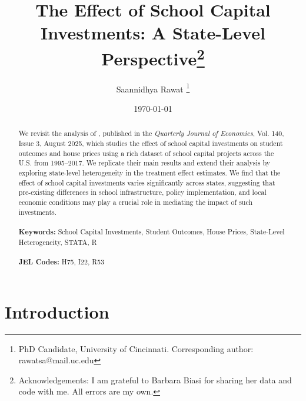 \documentclass[12pt]{article}
\begin{document}
\begin{titlepage}
\title{The Effect of School Capital Investments: A State-Level Perspective\thanks{Acknowledgements: I am grateful to Barbara Biasi for sharing her data and code with me. All errors are my own.}\\
}
\author{Saannidhya Rawat \thanks{PhD Candidate, University of Cincinnati. Corresponding author: rawatsa@mail.uc.edu}}
\date{\today} 
\maketitle


\begin{abstract}
\noindent We revisit the analysis of \cite{biasi_what_2025}, published in the \textit{Quarterly Journal of Economics}, Vol. 140, Issue 3, August 2025, which studies the effect of school capital investments on student outcomes and house prices using a rich dataset of school capital projects across the U.S. from 1995--2017. We replicate their main results and extend their analysis by exploring state-level heterogeneity in the treatment effect estimates. We find that the effect of school capital investments varies significantly across states, suggesting that pre-existing differences in school infrastructure, policy implementation, and local economic conditions may play a crucial role in mediating the impact of such investments.
\\
\vspace{0in}\\
\noindent\textbf{Keywords:} School Capital Investments, Student Outcomes, House Prices, State-Level Heterogeneity, STATA, R \\
\vspace{0in}\\
\noindent\textbf{JEL Codes:} H75, I22, R53\\

\bigskip
\end{abstract}
\setcounter{page}{0}
\thispagestyle{empty}
\end{titlepage}
\pagebreak \newpage

\doublespacing


\section{Introduction} \label{sec:introduction}
\end{document}
